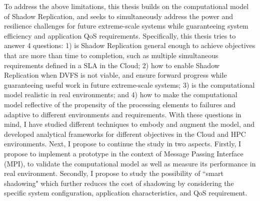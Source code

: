 To address the above limitations, this thesis builds on the computational model of Shadow Replication, and seeks to simultaneously address the power and resilience challenges for future extreme-scale systems while guaranteeing system efficiency and application QoS requirements.
Specifically, this thesis tries to answer 4 questions: 1) is Shadow Replication general enough to achieve objectives that are more than time to completion, such as multiple simultaneous requirements defined in a SLA in the Cloud; 2) how to enable Shadow Replication when DVFS is not viable, and ensure forward progress while guaranteeing useful work in future extreme-scale systems; 3) is the computational model realistic in real environments; and 4) how to make the computational model reflective of the propensity of the processing elements to failures and adaptive to different environments and requirements.
With these questions in mind, 
I have studied different techniques to embody and augment the model, and developed analytical frameworks for different objectives in the Cloud and HPC environments.
Next, I propose to continue the study in two aspects.
Firstly, I propose to implement a prototype in the context of Message Passing Interface (MPI), to validate the 
computational model as well as measure its performance in real environment. Secondly, I propose to study the possibility of 
``smart shadowing" which further reduces the cost of shadowing by considering the specific system configuration, application characteristics, and QoS requirement.



